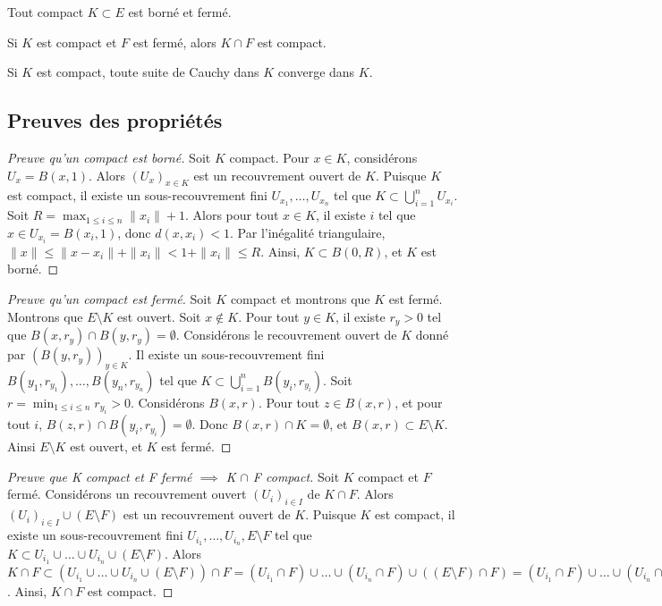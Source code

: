 \documentclass[oneside]{book}
\begin{document}
\begin{proposition}
Tout compact $K \subset E$ est borné et fermé.
\end{proposition}

\begin{proposition}
Si $K$ est compact et $F$ est fermé, alors $K \cap F$ est compact.
\end{proposition}

\begin{proposition}
Si $K$ est compact, toute suite de Cauchy dans $K$ converge dans $K$.
\end{proposition}

\subsection{Preuves des propriétés}

\begin{proof}[Preuve qu'un compact est borné]
Soit $K$ compact. Pour $x \in K$, considérons $U_x = B(x, 1)$. Alors $(U_x)_{x \in K}$ est un recouvrement ouvert de $K$. Puisque $K$ est compact, il existe un sous-recouvrement fini $U_{x_1}, \dots, U_{x_n}$ tel que $K \subset \bigcup_{i=1}^n U_{x_i}$. Soit $R = \max_{1 \leq i \leq n} \|x_i\| + 1$. Alors pour tout $x \in K$, il existe $i$ tel que $x \in U_{x_i} = B(x_i, 1)$, donc $d(x, x_i) < 1$. Par l'inégalité triangulaire, $\|x\| \leq \|x - x_i\| + \|x_i\| < 1 + \|x_i\| \leq R$. Ainsi, $K \subset B(0, R)$, et $K$ est borné.
\end{proof}

\begin{proof}[Preuve qu'un compact est fermé]
Soit $K$ compact et montrons que $K$ est fermé. Montrons que $E \setminus K$ est ouvert. Soit $x \notin K$. Pour tout $y \in K$, il existe $r_y > 0$ tel que $B(x, r_y) \cap B(y, r_y) = \emptyset$. Considérons le recouvrement ouvert de $K$ donné par $(B(y, r_y))_{y \in K}$. Il existe un sous-recouvrement fini $B(y_1, r_{y_1}), \dots, B(y_n, r_{y_n})$ tel que $K \subset \bigcup_{i=1}^n B(y_i, r_{y_i})$. Soit $r = \min_{1 \leq i \leq n} r_{y_i} > 0$. Considérons $B(x, r)$. Pour tout $z \in B(x, r)$, et pour tout $i$, $B(z, r) \cap B(y_i, r_{y_i}) = \emptyset$. Donc $B(x, r) \cap K = \emptyset$, et $B(x, r) \subset E \setminus K$. Ainsi $E \setminus K$ est ouvert, et $K$ est fermé.
\end{proof}

\begin{proof}[Preuve que K compact et F fermé $\implies$ K $\cap$ F compact]
Soit $K$ compact et $F$ fermé. Considérons un recouvrement ouvert $(U_i)_{i \in I}$ de $K \cap F$. Alors $(U_i)_{i \in I} \cup (E \setminus F)$ est un recouvrement ouvert de $K$. Puisque $K$ est compact, il existe un sous-recouvrement fini $U_{i_1}, \dots, U_{i_n}, E \setminus F$ tel que $K \subset U_{i_1} \cup \dots \cup U_{i_n} \cup (E \setminus F)$. Alors $K \cap F \subset (U_{i_1} \cup \dots \cup U_{i_n} \cup (E \setminus F)) \cap F = (U_{i_1} \cap F) \cup \dots \cup (U_{i_n} \cap F) \cup ((E \setminus F) \cap F) = (U_{i_1} \cap F) \cup \dots \cup (U_{i_n} \cap F) \subset U_{i_1} \cup \dots \cup U_{i_n}$. Ainsi, $K \cap F$ est compact.
\end{proof}
\end{document}
